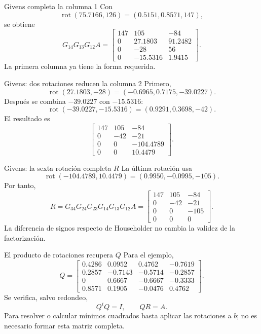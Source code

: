 \documentclass[aspectratio=169,12pt]{beamer}
\newcommand{\mat}[1]{\begin{bmatrix}#1\end{bmatrix}}
\begin{document}
\begin{frame}{Givens completa la columna 1}
Con
\[
\operatorname{rot}(75.7166,126)=(0.5151,0.8571,147),
\]
se obtiene
\[
G_{14}G_{13}G_{12}A=
\mat{
147&105&-84\\
0&27.1803&91.2482\\
0&-28&56\\
0&-15.5316&1.9415}.
\]
La primera columna ya tiene la forma requerida.
\end{frame}

\begin{frame}{Givens: dos rotaciones reducen la columna 2}
Primero,
\[
\operatorname{rot}(27.1803,-28)=(-0.6965,0.7175,-39.0227).
\]
Después se combina $-39.0227$ con $-15.5316$:
\[
\operatorname{rot}(-39.0227,-15.5316)=(0.9291,0.3698,-42).
\]
El resultado es
\[
\mat{147&105&-84\\0&-42&-21\\0&0&-104.4789\\0&0&10.4479}.
\]
\end{frame}

\begin{frame}{Givens: la sexta rotación completa $R$}
La última rotación usa
\[
\operatorname{rot}(-104.4789,10.4479)
=(0.9950,-0.0995,-105).
\]
Por tanto,
\[
R=G_{34}G_{24}G_{23}G_{14}G_{13}G_{12}A
=\mat{147&105&-84\\0&-42&-21\\0&0&-105\\0&0&0}.
\]
La diferencia de signos respecto de Householder no cambia la validez de la
factorización.
\end{frame}

\begin{frame}{El producto de rotaciones recupera $Q$}
Para el ejemplo,
\[
Q=\mat{
0.4286&0.0952&0.4762&-0.7619\\
0.2857&-0.7143&-0.5714&-0.2857\\
0&0.6667&-0.6667&-0.3333\\
0.8571&0.1905&-0.0476&0.4762}.
\]
Se verifica, salvo redondeo,
\[
Q^tQ=I,
\qquad QR=A.
\]
Para resolver o calcular mínimos cuadrados basta aplicar las rotaciones a $b$;
no es necesario formar esta matriz completa.
\end{frame}
\end{document}
